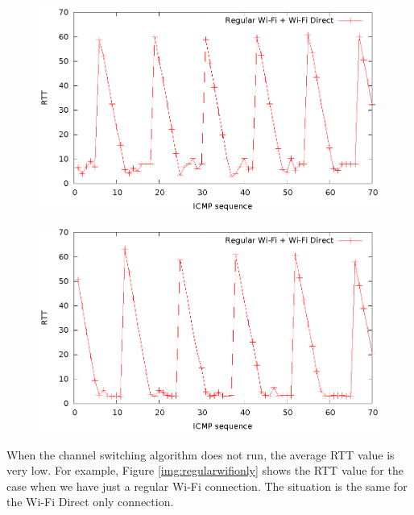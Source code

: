 \begin{figure}[h!]
\includegraphics{src/img/regularwifi.eps}
\label{img:regular-wifi}
\end{figure}

\begin{figure}[h!]
\includegraphics{src/img/wifidirectping.eps}
\label{img:wifi-direct}
\end{figure}

When the channel switching algorithm does not run, the average RTT value is very low. For example, Figure \ref{img:regularwifionly} shows the RTT value for the case when we have just a regular Wi-Fi connection. The situation is the same for the Wi-Fi Direct only connection.


